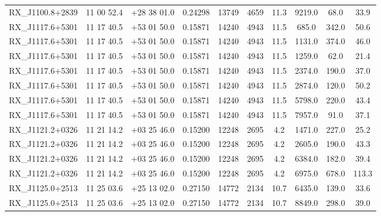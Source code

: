 \begin{landscape}
\begin{center}
\begin{longtable}{l c c c c c c c c c}
RX\_J1100.8+2839  &        11 00 52.4  &         $+$28 38 01.0  &       0.24298  & 13749  &   4659  &       11.3  &      9219.0  &  68.0  &   33.9  \\
RX\_J1117.6+5301  &        11 17 40.5  &         $+$53 01 50.0  &       0.15871  & 14240  &   4943  &       11.5  &      685.0  &   342.0  &  50.6  \\
RX\_J1117.6+5301  &        11 17 40.5  &         $+$53 01 50.0  &       0.15871  & 14240  &   4943  &       11.5  &      1131.0  &  374.0  &  46.0  \\
RX\_J1117.6+5301  &        11 17 40.5  &         $+$53 01 50.0  &       0.15871  & 14240  &   4943  &       11.5  &      1259.0  &  62.0  &   21.4  \\
RX\_J1117.6+5301  &        11 17 40.5  &         $+$53 01 50.0  &       0.15871  & 14240  &   4943  &       11.5  &      2374.0  &  190.0  &  37.0  \\
RX\_J1117.6+5301  &        11 17 40.5  &         $+$53 01 50.0  &       0.15871  & 14240  &   4943  &       11.5  &      2874.0  &  120.0  &  50.2  \\
RX\_J1117.6+5301  &        11 17 40.5  &         $+$53 01 50.0  &       0.15871  & 14240  &   4943  &       11.5  &      5798.0  &  220.0  &  43.4  \\
RX\_J1117.6+5301  &        11 17 40.5  &         $+$53 01 50.0  &       0.15871  & 14240  &   4943  &       11.5  &      7957.0  &  91.0  &   37.1  \\
RX\_J1121.2+0326  &        11 21 14.2  &         $+$03 25 46.0  &       0.15200  & 12248  &   2695  &       4.2  &       1471.0  &  227.0  &  25.2  \\
RX\_J1121.2+0326  &        11 21 14.2  &         $+$03 25 46.0  &       0.15200  & 12248  &   2695  &       4.2  &       2605.0  &  190.0  &  43.3  \\
RX\_J1121.2+0326  &        11 21 14.2  &         $+$03 25 46.0  &       0.15200  & 12248  &   2695  &       4.2  &       6384.0  &  182.0  &  39.4  \\
RX\_J1121.2+0326  &        11 21 14.2  &         $+$03 25 46.0  &       0.15200  & 12248  &   2695  &       4.2  &       6975.0  &  678.0  &  113.3  \\
RX\_J1125.0+2513  &        11 25 03.6  &         $+$25 13 02.0  &       0.27150  & 14772  &   2134  &       10.7  &      6435.0  &  139.0  &  33.6  \\
RX\_J1125.0+2513  &        11 25 03.6  &         $+$25 13 02.0  &       0.27150  & 14772  &   2134  &       10.7  &      8849.0  &  298.0  &  39.0  \\

\end{longtable}
\end{center}
\end{landscape}
